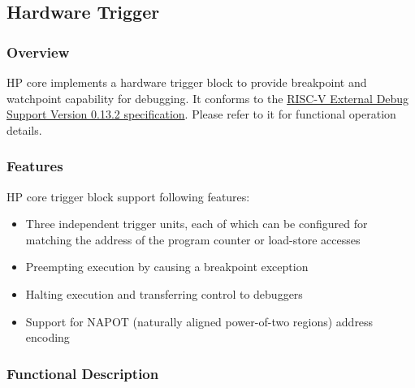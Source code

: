 \documentclass[main\_\_EN.tex]{subfiles}
\begin{document}















\newpage
\subsection{Hardware Trigger}
\label{sec:riscvcpu-hwt}

\subsubsection{Overview}
\label{sec:riscvcpu-hwt-overview}
HP core implements a hardware trigger block to provide breakpoint and watchpoint capability for debugging. It conforms to the \href{https://riscv.org/wp-content/uploads/2019/03/riscv-debug-release.pdf} {RISC-V External Debug Support Version 0.13.2 specification}. Please refer to it for functional operation details.

\subsubsection{Features}
\label{sec:riscvcpu-hwt-features}

HP core trigger block support following features:

\begin{itemize}
    \item Three independent trigger units, each of which can be configured for matching the address of the program counter or load-store accesses
    \item Preempting execution by causing a breakpoint exception
    \item Halting execution and transferring control to debuggers
    \item Support for NAPOT (naturally aligned power-of-two regions) address encoding
\end{itemize}

\subsubsection{Functional Description}
\label{sec:riscvcpu-hwt-func-descr}
\end{document}
